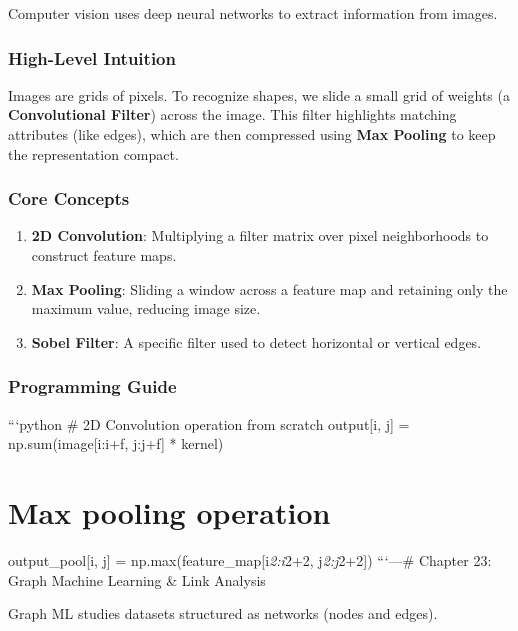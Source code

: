 Computer vision uses deep neural networks to extract information from
images.

\subsubsection{High-Level Intuition}\label{high-level-intuition-21}

Images are grids of pixels. To recognize shapes, we slide a small grid
of weights (a \textbf{Convolutional Filter}) across the image. This
filter highlights matching attributes (like edges), which are then
compressed using \textbf{Max Pooling} to keep the representation
compact.

\subsubsection{Core Concepts}\label{core-concepts-13}

\begin{enumerate}
\def\labelenumi{\arabic{enumi}.}
\tightlist
\item
  \textbf{2D Convolution}: Multiplying a filter matrix over pixel
  neighborhoods to construct feature maps.
\item
  \textbf{Max Pooling}: Sliding a window across a feature map and
  retaining only the maximum value, reducing image size.
\item
  \textbf{Sobel Filter}: A specific filter used to detect horizontal or
  vertical edges.
\end{enumerate}

\subsubsection{Programming Guide}\label{programming-guide-21}

```python \# 2D Convolution operation from scratch output{[}i, j{]} =
np.sum(image{[}i:i+f, j:j+f{]} * kernel)

\section{Max pooling operation}\label{max-pooling-operation}

output\_pool{[}i, j{]} = np.max(feature\_map{[}i\emph{2:i}2+2,
j\emph{2:j}2+2{]}) ```\n\n---\n\n\# Chapter 23: Graph Machine Learning
\& Link Analysis

Graph ML studies datasets structured as networks (nodes and edges).

